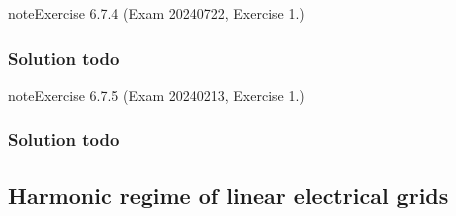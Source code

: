 \documentclass[letterpaper,10pt,english]{jupyterBook}
\begin{document}
\begin{sphinxadmonition}{note}{Exercise 6.7.4 (Exam 2024\sphinxhyphen{}07\sphinxhyphen{}22, Exercise 1.)}



\begin{figure}[htbp]
\centering

\noindent{}
\end{figure}
\subsubsection*{Solution \sphinxhyphen{} todo}
\end{sphinxadmonition}
 \label{exercise:exam-24-02-13-exe-01-b}

\begin{sphinxadmonition}{note}{Exercise 6.7.5 (Exam 2024\sphinxhyphen{}02\sphinxhyphen{}13, Exercise 1.)}



\begin{figure}[htbp]
\centering

\noindent{}
\end{figure}
\subsubsection*{Solution \sphinxhyphen{} todo}
\end{sphinxadmonition}

\sphinxstepscope


\subsection{Harmonic regime of linear electrical grids}
\label{\detokenize{ch/electrical-engineering-exercises-harmonic:harmonic-regime-of-linear-electrical-grids}}\label{\detokenize{ch/electrical-engineering-exercises-harmonic:classical-electromagnetism-electrical-engineering-exercises-harmonic}}\label{\detokenize{ch/electrical-engineering-exercises-harmonic::doc}} \label{exercise:exam-25-02-11-exe-02}
\end{document}
